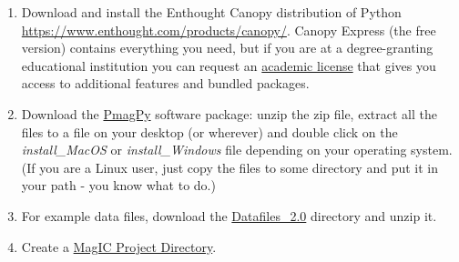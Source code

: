 \documentclass[11pt]{book}
\begin{document}
{ \begin{enumerate}
 \item Download and install the Enthought Canopy distribution of Python \url{https://www.enthought.com/products/canopy/}. Canopy Express (the free version) contains everything you need, but if you are at a degree-granting educational institution you can request an \href{https://www.enthought.com/products/canopy/academic/}{academic license} that gives you access to additional features and bundled packages.
 \item Download the \href{https://github.com/ltauxe/PmagPy}{PmagPy} software package: unzip the zip file, extract all the files to a file on your desktop (or wherever)  and double click on the {\it install\_MacOS} or {\it install\_Windows} file depending on your operating system.  (If you are a Linux user, just copy the files to some directory and put it in your path - you know what to do.)
 \item For example data files, download the \href{#Datafiles}{Datafiles\_2.0} directory and unzip it.
  \item Create a \href{#Project_Directory}{MagIC Project Directory}.

\end{enumerate}}
\end{document}
